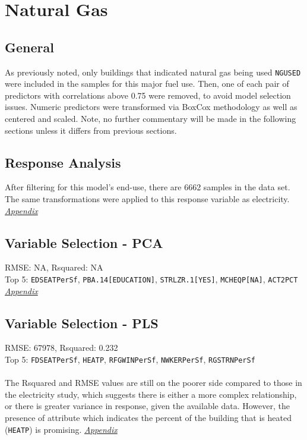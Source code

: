 \section{Natural Gas}
\label{sec:natural_gas}

\subsection{General}
As previously noted, only buildings that indicated natural gas being used \lstinline{NGUSED} were included in the samples for this major fuel use.  Then, one of each pair of predictors with correlations above 0.75 were removed, to avoid model selection issues. Numeric predictors were transformed via BoxCox methodology as well as centered and scaled.  Note, no further commentary will be made in the following sections unless it differs from previous sections.

\subsection{Response Analysis}

After filtering for this model's end-use, there are 6662 samples in the data set.  The same transformations were applied to this response variable as electricity. \textit{\hyperref[appendix:natural_gas:response]{Appendix}}

\subsection{Variable Selection - PCA}
RMSE: NA, Rsquared: NA\\
Top 5: \lstinline{EDSEATPerSf}, \lstinline{PBA.14[EDUCATION]}, \lstinline{STRLZR.1[YES]}, \lstinline{MCHEQP[NA]}, \lstinline{ACT2PCT}  \textit{\hyperref[appendix:natural_gas:pca]{Appendix}}

\subsection{Variable Selection - PLS}
RMSE: 67978, Rsquared: 0.232\\
Top 5: \lstinline{FDSEATPerSf}, \lstinline{HEATP}, \lstinline{RFGWINPerSf}, \lstinline{NWKERPerSf}, \lstinline{RGSTRNPerSf}\\
\\[0.1in]
The Rsquared and RMSE values are still on the poorer side compared to those in the electricity study, which suggests there is either a more complex relationship, or there is greater variance in response, given the available data. However, the presence of attribute which indicates the percent of the building that is heated (\lstinline{HEATP}) is promising.   \textit{\hyperref[appendix:natural_gas:pls]{Appendix}}

